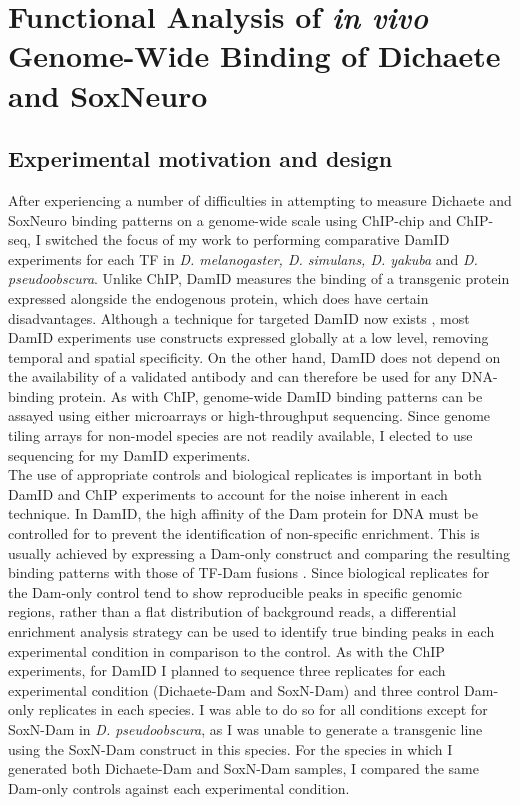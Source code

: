 \chapter{Functional Analysis of \emph{in vivo} Genome-Wide Binding of Dichaete and SoxNeuro}

\hrulefill

\section{Experimental motivation and design}
After experiencing a number of difficulties in attempting to measure Dichaete and SoxNeuro binding patterns on a genome-wide scale using ChIP-chip and ChIP-seq, I switched the focus of my work to performing comparative DamID experiments for each TF in \emph{D. melanogaster, D. simulans, D. yakuba} and \emph{D. pseudoobscura}. Unlike ChIP, DamID measures the binding of a transgenic protein expressed alongside the endogenous protein, which does have certain disadvantages. Although a technique for targeted DamID now exists \citep{southall_cell-type-specific_2013}, most DamID experiments use constructs expressed globally at a low level, removing temporal and spatial specificity. On the other hand, DamID does not depend on the availability of a validated antibody and can therefore be used for any DNA-binding protein. As with ChIP, genome-wide DamID binding patterns can be assayed using either microarrays or high-throughput sequencing. Since genome tiling arrays for non-model species are not readily available, I elected to use sequencing for my DamID experiments.\\

The use of appropriate controls and biological replicates is important in both DamID and ChIP experiments to account for the noise inherent in each technique. In DamID, the high affinity of the Dam protein for DNA must be controlled for to prevent the identification of non-specific enrichment. This is usually achieved by expressing a Dam-only construct and comparing the resulting binding patterns with those of TF-Dam fusions \citep{greil_[16]_2006, vogel_detection_2007}. Since biological replicates for the Dam-only control tend to show reproducible peaks in specific genomic regions, rather than a flat distribution of background reads, a differential enrichment analysis strategy can be used to identify true binding peaks in each experimental condition in comparison to the control. As with the ChIP experiments, for DamID I planned to sequence three replicates for each experimental condition (Dichaete-Dam and SoxN-Dam) and three control Dam-only replicates in each species. I was able to do so for all conditions except for SoxN-Dam in \emph{D. pseudoobscura}, as I was unable to generate a transgenic line using the SoxN-Dam construct in this species. For the species in which I generated both Dichaete-Dam and SoxN-Dam samples, I compared the same Dam-only controls against each experimental condition.\\

